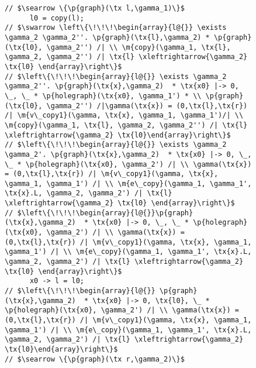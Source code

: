 \documentclass[acmsmall,review,anonymous]{acmart}\settopmatter{printfolios=true,printccs=false,printacmref=false}
\newcommand{\tx}[1]{\text{#1}}
\newcommand{\p}[1]{\ensuremath{\mathsf{#1}}} \newcommand{\m}[1]{\ensuremath{\mathit{#1}}} \newcommand{\ma}[1]{\ensuremath{\mathcal{#1}}} \let\ramify\lightning
\begin{document}
\begin{figure}
\begin{lstlisting}
// $\searrow \{\p{graph}(\tx l,\gamma_1)\}$
      l0 = copy(l);
// $\swarrow \left\{\!\!\!\begin{array}{l@{}} \exists \gamma_2 \gamma_2''. \p{graph}(\tx{l},\gamma_2) * \p{graph}(\tx{l0}, \gamma_2'') /| \\ \m{copy}(\gamma_1, \tx{l}, \gamma_2, \gamma_2'') /| \tx{l} \xleftrightarrow{\gamma_2} \tx{l0} \end{array}\right\}$
// $\left\{\!\!\!\begin{array}{l@{}} \exists \gamma_2 \gamma_2''. \p{graph}(\tx{x},\gamma_2)  * \tx{x0} |-> 0, \_, \_ * \p{holegraph}(\tx{x0}, \gamma_1') * \\ \p{graph}(\tx{l0}, \gamma_2'') /|\gamma(\tx{x}) = (0,\tx{l},\tx{r}) /| \m{v\_copy1}(\gamma, \tx{x}, \gamma_1, \gamma_1')/| \\ \m{copy}(\gamma_1, \tx{l}, \gamma_2, \gamma_2'') /| \tx{l} \xleftrightarrow{\gamma_2} \tx{l0}\end{array}\right\}$
// $\left\{\!\!\!\begin{array}{l@{}} \exists \gamma_2 \gamma_2'. \p{graph}(\tx{x},\gamma_2)  * \tx{x0} |-> 0, \_, \_ * \p{holegraph}(\tx{x0}, \gamma_2') /| \\ \gamma(\tx{x}) = (0,\tx{l},\tx{r}) /| \m{v\_copy1}(\gamma, \tx{x}, \gamma_1, \gamma_1') /| \\ \m{e\_copy}(\gamma_1, \gamma_1', \tx{x}.L, \gamma_2, \gamma_2') /| \tx{l} \xleftrightarrow{\gamma_2} \tx{l0} \end{array}\right\}$
// $\left\{\!\!\!\begin{array}{l@{}}\p{graph}(\tx{x},\gamma_2)  * \tx{x0} |-> 0, \_, \_ * \p{holegraph}(\tx{x0}, \gamma_2') /| \\ \gamma(\tx{x}) = (0,\tx{l},\tx{r}) /| \m{v\_copy1}(\gamma, \tx{x}, \gamma_1, \gamma_1') /| \\ \m{e\_copy}(\gamma_1, \gamma_1', \tx{x}.L, \gamma_2, \gamma_2') /| \tx{l} \xleftrightarrow{\gamma_2} \tx{l0} \end{array}\right\}$
      x0 -> l = l0;
// $\left\{\!\!\!\begin{array}{l@{}} \p{graph}(\tx{x},\gamma_2)  * \tx{x0} |-> 0, \tx{l0}, \_ * \p{holegraph}(\tx{x0}, \gamma_2') /| \\ \gamma(\tx{x}) = (0,\tx{l},\tx{r}) /| \m{v\_copy1}(\gamma, \tx{x}, \gamma_1, \gamma_1') /| \\ \m{e\_copy}(\gamma_1, \gamma_1', \tx{x}.L, \gamma_2, \gamma_2') /| \tx{l} \xleftrightarrow{\gamma_2} \tx{l0}\end{array}\right\}$
// $\searrow \{\p{graph}(\tx r,\gamma_2)\}$

\end{lstlisting}
\end{figure}
\end{document}
